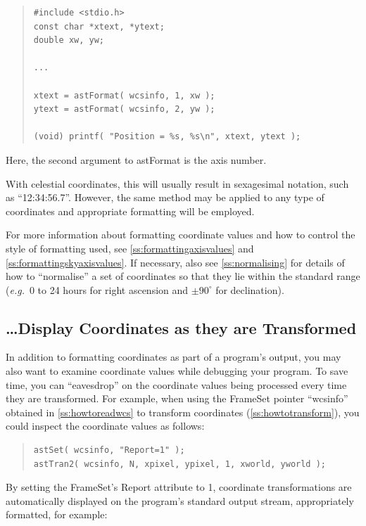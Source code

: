 \documentclass[twoside,11pt]{article}
\newcommand{\htmlref}[2]{#1}
\newcommand{\secref}[1]{\S\ref{#1}}
\renewcommand{\secref}[1]{\ref{#1}}
\begin{document}
\begin{quote}
\small
\begin{verbatim}
#include <stdio.h>
const char *xtext, *ytext;
double xw, yw;

...

xtext = astFormat( wcsinfo, 1, xw );
ytext = astFormat( wcsinfo, 2, yw );

(void) printf( "Position = %s, %s\n", xtext, ytext );
\end{verbatim}
\normalsize
\end{quote}

Here, the second argument to \htmlref{astFormat}{astFormat} is the axis number.

With celestial coordinates, this will usually result in sexagesimal
notation, such as ``12:34:56.7''. However, the same method may be
applied to any type of coordinates and appropriate formatting will be
employed.

For more information about formatting coordinate values and how to
control the style of formatting used, see
\secref{ss:formattingaxisvalues} and
\secref{ss:formattingskyaxisvalues}. If necessary, also see
\secref{ss:normalising} for details of how to ``normalise'' a set of
coordinates so that they lie within the standard range ({\em{e.g.}}\ 0
to 24 hours for right ascension and $\pm 90^\circ$ for
declination).

\subsection{\ldots Display Coordinates as they are Transformed}

In addition to formatting coordinates as part of a program's output,
you may also want to examine coordinate values while debugging your
program. To save time, you can ``eavesdrop'' on the coordinate values
being processed every time they are transformed. For example, when
using the \htmlref{FrameSet}{FrameSet} pointer ``wcsinfo'' obtained in
\secref{ss:howtoreadwcs} to transform coordinates
(\secref{ss:howtotransform}), you could inspect the coordinate values
as follows:

\begin{quote}
\small
\begin{verbatim}
astSet( wcsinfo, "Report=1" );
astTran2( wcsinfo, N, xpixel, ypixel, 1, xworld, yworld );
\end{verbatim}
\normalsize
\end{quote}

By setting the FrameSet's \htmlref{Report}{Report} attribute to 1, coordinate
transformations are automatically displayed on the program's standard
output stream, appropriately formatted, for example:
\end{document}
